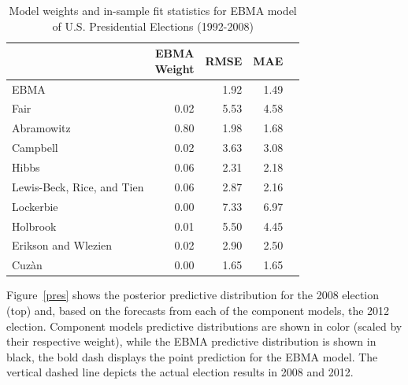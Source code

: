 \documentclass[12pt,fullpage,endnotes]{article}
\begin{document}
\begin{table}[ht]
\caption{Model weights and in-sample fit statistics for EBMA model of U.S. Presidential Elections (1992-2008)}
\label{presModel}
\begin{center}
\begin{tabular}{lrrrr}
  \toprule
 & \shortstack{EBMA\\ Weight}&RMSE &MAE \\ 
  \midrule
  EBMA &  & 1.92 & 1.49 \\ 
  Fair & 0.02 & 5.53 & 4.58 \\ 
  Abramowitz & 0.80 & 1.98 & 1.68 \\ 
  Campbell & 0.02 & 3.63 & 3.08 \\ 
  Hibbs & 0.06 & 2.31 & 2.18 \\ 
  Lewis-Beck, Rice, and Tien  & 0.06 & 2.87 & 2.16 \\ 
  Lockerbie & 0.00 & 7.33 & 6.97 \\ 
  Holbrook & 0.01 & 5.50 & 4.45 \\ 
  Erikson and Wlezien  & 0.02 & 2.90 & 2.50 \\ 
  Cuz\`an	 & 0.00 & 1.65 & 1.65 \\ 
  
   \bottomrule
\end{tabular}
\end{center}
\end{table}


Figure~\ref{pres} shows the posterior predictive distribution for the
2008 election (top) and, based on the forecasts from each of the
component models, the 2012 election.  Component models predictive
distributions are shown in color (scaled by their respective weight),
while the EBMA predictive distribution is shown in black, the bold
dash displays the point prediction for the EBMA model. The vertical
dashed line depicts the actual election results in 2008 and 2012.
\end{document}
